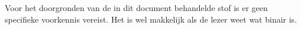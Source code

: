Voor het doorgronden van de in dit document behandelde stof is er geen specifieke voorkennis vereist. Het is wel makkelijk als de lezer weet wat binair is.

